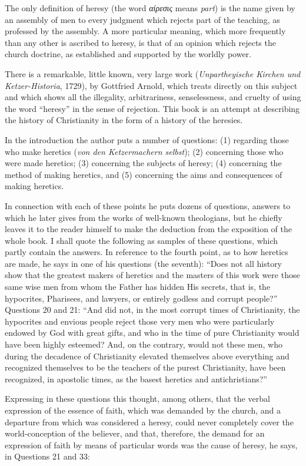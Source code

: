 \documentclass{book}
\begin{document}
The only definition of heresy (the word \emph{αίρεσις} means \emph{part}) is the name given by an assembly of men to every judgment which rejects part of the teaching, as professed by the assembly. A more particular meaning, which more frequently than any other is ascribed to heresy, is that of an opinion which rejects the church doctrine, as established and supported by the worldly power.

There is a remarkable, little known, very large work (\emph{Unpartheyische Kirchen und Ketzer-Historia}, 1729), by Gottfried Arnold, which treats directly on this subject and which shows all the illegality, arbitrariness, senselessness, and cruelty of using the word “heresy” in the sense of rejection. This book is an attempt at describing the history of Christianity in the form of a history of the heresies.

In the introduction the author puts a number of questions: (1) regarding those who make heretics (\emph{von den Ketzermachern selbst}); (2) concerning those who were made heretics; (3) concerning the subjects of heresy; (4) concerning the method of making heretics, and (5) concerning the aims and consequences of making heretics.

In connection with each of these points he puts dozens of questions, answers to which he later gives from the works of well-known theologians, but he chiefly leaves it to the reader himself to make the deduction from the exposition of the whole book. I shall quote the following as samples of these questions, which partly contain the answers. In reference to the fourth point, as to how heretics are made, he says in one of his questions (the seventh): “Does not all history show that the greatest makers of heretics and the masters of this work were those same wise men from whom the Father has hidden His secrets, that is, the hypocrites, Pharisees, and lawyers, or entirely godless and corrupt people?” Questions 20 and 21: “And did not, in the most corrupt times of Christianity, the hypocrites and envious people reject those very men who were particularly endowed by God with great gifts, and who in the time of pure Christianity would have been highly esteemed? And, on the contrary, would not these men, who during the decadence of Christianity elevated themselves above everything and recognized themselves to be the teachers of the purest Christianity, have been recognized, in apostolic times, as the basest heretics and antichristians?”

Expressing in these questions this thought, among others, that the verbal expression of the essence of faith, which was demanded by the church, and a departure from which was considered a heresy, could never completely cover the world-conception of the believer, and that, therefore, the demand for an expression of faith by means of particular words was the cause of heresy, he says, in Questions 21 and 33:
\end{document}
